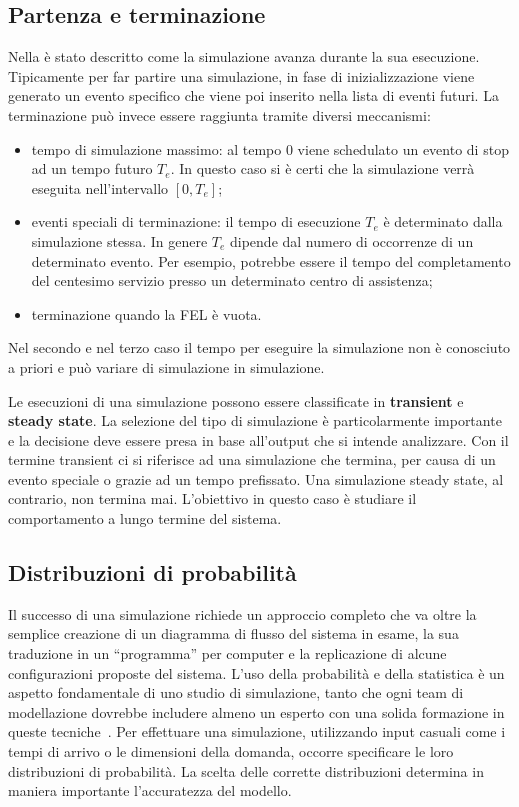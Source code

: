 \documentclass[12pt,a4paper,openright,twoside]{book}
\begin{document}
\subsection{Partenza e terminazione}
Nella  è stato descritto come la simulazione avanza durante la sua esecuzione. Tipicamente per far partire una simulazione, in fase di inizializzazione viene generato un evento specifico che viene poi inserito nella lista di eventi futuri. 
La terminazione può invece essere raggiunta tramite diversi meccanismi: 
\begin{itemize}
    \item tempo di simulazione massimo: al tempo 0 viene schedulato un evento di stop ad un tempo futuro $T_e$. In questo caso si è certi che la simulazione verrà eseguita nell'intervallo $[0, T_e]$; 
    \item eventi speciali di terminazione: il tempo di esecuzione $T_e$ è determinato dalla simulazione stessa. In genere $T_e$ dipende dal numero di occorrenze di un determinato evento. Per esempio, potrebbe essere il tempo del completamento del centesimo servizio presso un determinato centro di assistenza;  
    \item terminazione quando la FEL è vuota.
\end{itemize}
Nel secondo e nel terzo caso il tempo per eseguire la simulazione non è conosciuto a priori e può variare di simulazione in simulazione.

Le esecuzioni di una simulazione possono essere classificate in \textbf{transient} e \textbf{steady state}. La selezione del tipo di simulazione è particolarmente importante e la decisione deve essere presa in base all'output che si intende analizzare. Con il termine transient ci si riferisce ad una simulazione che termina, per causa di un evento speciale o grazie ad un tempo prefissato. 
Una simulazione steady state, al contrario, non termina mai. L'obiettivo in questo caso è studiare il comportamento a lungo termine del sistema. 

\subsection{Distribuzioni di probabilità}
Il successo di una simulazione richiede un approccio completo che va oltre la semplice creazione di un diagramma di flusso del sistema in esame, la sua traduzione in un ``programma'' per computer e la replicazione di alcune configurazioni proposte del sistema. L'uso della probabilità e della statistica è un aspetto fondamentale di uno studio di simulazione, tanto che ogni team di modellazione dovrebbe includere almeno un esperto con una solida formazione in queste tecniche~\cite{Law15}.
Per effettuare una simulazione, utilizzando input casuali come i tempi di arrivo o le dimensioni della domanda, occorre specificare le loro distribuzioni di probabilità. La scelta delle corrette distribuzioni determina in maniera importante l'accuratezza del modello. 
\end{document}
